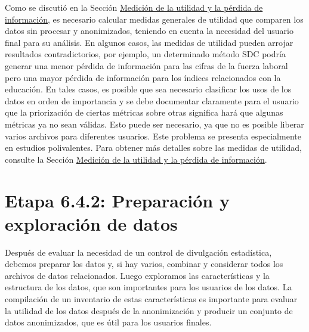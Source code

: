 \documentclass[]{book}
\theoremstyle{definition}
\theoremstyle{definition}
\theoremstyle{definition}
\theoremstyle{definition}
\theoremstyle{remark}
\begin{document}
Como se discutió en la Sección \protect\hyperlink{mediciuxf3n-de-la-utilidad-y-la-puxe9rdida-de-informaciuxf3n}{Medición de la utilidad y la pérdida de información}, es necesario calcular medidas generales de utilidad que comparen los datos sin procesar y anonimizados, teniendo en cuenta la necesidad del usuario final para su análisis. En algunos casos, las medidas de utilidad pueden arrojar resultados contradictorios, por ejemplo, un determinado método SDC podría generar una menor pérdida de información para las cifras de la fuerza laboral pero una mayor pérdida de información para los índices relacionados con la educación. En tales casos, es posible que sea necesario clasificar los usos de los datos en orden de importancia y se debe documentar claramente para el usuario que la priorización de ciertas métricas sobre otras significa hará que algunas métricas ya no sean válidas. Esto puede ser necesario, ya que no es posible liberar varios archivos para diferentes usuarios. Este problema se presenta especialmente en estudios polivalentes. Para obtener más detalles sobre las medidas de utilidad, consulte la Sección \protect\hyperlink{mediciuxf3n-de-la-utilidad-y-la-puxe9rdida-de-informaciuxf3n}{Medición de la utilidad y la pérdida de información}.

\hypertarget{etapa-6.4.2-preparaciuxf3n-y-exploraciuxf3n-de-datos}{%
\section{Etapa 6.4.2: Preparación y exploración de datos}\label{etapa-6.4.2-preparaciuxf3n-y-exploraciuxf3n-de-datos}}

Después de evaluar la necesidad de un control de divulgación estadística, debemos preparar los datos y, si hay varios, combinar y considerar todos los archivos de datos relacionados. Luego exploramos las características y la estructura de los datos, que son importantes para los usuarios de los datos. La compilación de un inventario de estas características es importante para evaluar la utilidad de los datos después de la anonimización y producir un conjunto de datos anonimizados, que es útil para los usuarios finales.
\end{document}
